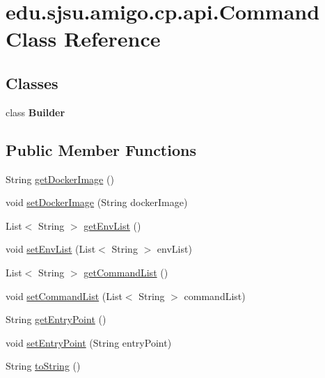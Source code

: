 \hypertarget{classedu_1_1sjsu_1_1amigo_1_1cp_1_1api_1_1_command}{}\section{edu.\+sjsu.\+amigo.\+cp.\+api.\+Command Class Reference}
\label{classedu_1_1sjsu_1_1amigo_1_1cp_1_1api_1_1_command}
\subsection*{Classes}
\begin{DoxyCompactItemize}
\item 
class {\bfseries Builder}
\end{DoxyCompactItemize}
\subsection*{Public Member Functions}
\begin{DoxyCompactItemize}
\item 
String \hyperlink{classedu_1_1sjsu_1_1amigo_1_1cp_1_1api_1_1_command_a48020511d6034df5b530b259a02897d5}{get\+Docker\+Image} ()
\item 
void \hyperlink{classedu_1_1sjsu_1_1amigo_1_1cp_1_1api_1_1_command_a4b375c29b1e01240bfc7f8bafe5626c3}{set\+Docker\+Image} (String docker\+Image)
\item 
List$<$ String $>$ \hyperlink{classedu_1_1sjsu_1_1amigo_1_1cp_1_1api_1_1_command_ab1ef50a6a8e7d392f434ed4727444a6b}{get\+Env\+List} ()
\item 
void \hyperlink{classedu_1_1sjsu_1_1amigo_1_1cp_1_1api_1_1_command_afbbfb4a7a61b9d5cf068942c7c8d8de1}{set\+Env\+List} (List$<$ String $>$ env\+List)
\item 
List$<$ String $>$ \hyperlink{classedu_1_1sjsu_1_1amigo_1_1cp_1_1api_1_1_command_ad02fe4992c2a9ce9616af6b7e7efd8b7}{get\+Command\+List} ()
\item 
void \hyperlink{classedu_1_1sjsu_1_1amigo_1_1cp_1_1api_1_1_command_afa5c2a4fa49387f593f7ae12eb3dfb05}{set\+Command\+List} (List$<$ String $>$ command\+List)
\item 
String \hyperlink{classedu_1_1sjsu_1_1amigo_1_1cp_1_1api_1_1_command_a47268340434247dc6944503874bba6dd}{get\+Entry\+Point} ()
\item 
void \hyperlink{classedu_1_1sjsu_1_1amigo_1_1cp_1_1api_1_1_command_a43c60eb1ef3143276a0110f0e081db52}{set\+Entry\+Point} (String entry\+Point)
\item 
String \hyperlink{classedu_1_1sjsu_1_1amigo_1_1cp_1_1api_1_1_command_ac3596d6b535e34cfb01944fbbbbcf822}{to\+String} ()
\end{DoxyCompactItemize}


